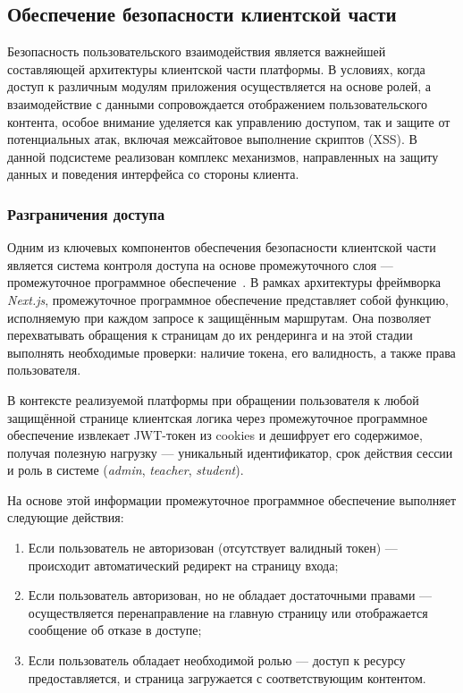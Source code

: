\subsection{Обеспечение безопасности клиентской части}

Безопасность пользовательского взаимодействия является важнейшей составляющей архитектуры клиентской части платформы. В условиях, когда доступ к различным модулям приложения осуществляется на основе ролей, а взаимодействие с данными сопровождается отображением пользовательского контента, особое внимание уделяется как управлению доступом, так и защите от потенциальных атак, включая межсайтовое выполнение скриптов (XSS). В данной подсистеме реализован комплекс механизмов, направленных на защиту данных и поведения интерфейса со стороны клиента.

\subsubsection{Разграничения доступа}
Одним из ключевых компонентов обеспечения безопасности клиентской части является система контроля доступа на основе промежуточного слоя — промежуточное программное обеспечение~\cite{nextjs_middleware}. В рамках архитектуры фреймворка \textit{Next.js}, промежуточное программное обеспечение представляет собой функцию, исполняемую при каждом запросе к защищённым маршрутам. Она позволяет перехватывать обращения к страницам до их рендеринга и на этой стадии выполнять необходимые проверки: наличие токена, его валидность, а также права пользователя.

В контексте реализуемой платформы при обращении пользователя к любой защищённой странице клиентская логика через промежуточное программное обеспечение извлекает JWT-токен из cookies и дешифрует его содержимое, получая полезную нагрузку — уникальный идентификатор, срок действия сессии и роль в системе (\textit{admin}, \textit{teacher}, \textit{student}).

На основе этой информации промежуточное программное обеспечение выполняет следующие действия:
\begin{enumerate}
  \item Если пользователь не авторизован (отсутствует валидный токен) — происходит автоматический редирект на страницу входа;
  \item Если пользователь авторизован, но не обладает достаточными правами — осуществляется перенаправление на главную страницу или отображается сообщение об отказе в доступе;
  \item Если пользователь обладает необходимой ролью — доступ к ресурсу предоставляется, и страница загружается с соответствующим контентом.
\end{enumerate}

